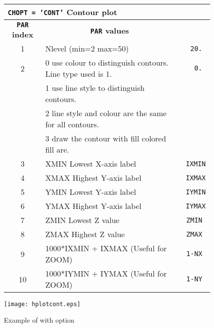 \begin{figure}[p]
\begin{center}
\begin{tabular}{||c|p{11cm}|>{\tt}r||}
\hline
\multicolumn{3}{||l||}{\bf {\tt CHOPT = 'CONT'} Contour plot}
\\
\hline
\multicolumn{1}{||c|}{\bf {\tt PAR} index}        &
\multicolumn{1}{c|}{\bf {\tt PAR} values}         &
\multicolumn{1}{c||}{\bf default}                \\
\hline
 1   & Nlevel (min=2 max=50)                                        &   20.   \\
 2   & 0 use colour to distinguish contours. Line type used is 1.   &    0.   \\
     & 1 use line style to distinguish contours.                    &         \\
     & 2 line style and colour are the same for all contours.       &         \\
     & 3 draw the contour with fill colored fill are.               &         \\
 3   & XMIN Lowest X-axis label                                     &   IXMIN \\
 4   & XMAX Highest Y-axis label                                    &   IXMAX \\
 5   & YMIN Lowest Y-axis label                                     &   IYMIN \\
 6   & YMAX Highest Y-axis label                                    &   IYMAX \\
 7   & ZMIN Lowest Z value                                          &   ZMIN  \\
 8   & ZMAX Highest Z value                                         &   ZMAX  \\
 9   & 1000*IXMIN + IXMAX (Useful for ZOOM)                         &   1-NX  \\
 10  & 1000*IYMIN + IYMAX (Useful for ZOOM)                         &   1-NY  \\
\hline
\end{tabular}
\end{center}
\bigskip
\begin{center} \texttt{[image: hplotcont.eps]} \end{center}
\caption{Example of \protect{} with \protect{} option}
\end{figure}

